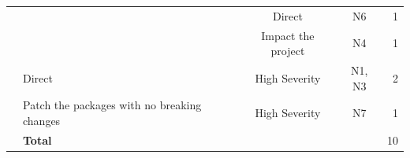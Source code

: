 \documentclass[conference]{IEEEtran}
\begin{document}
\begin{table}[tb]
\begin{tabular}{|c|l|c|c|r|}
			\multicolumn{1}{|c|}{}                                     & \multicolumn{1}{c|}{}                               & Direct                                             & N6                  & 1               \\ \cline{3-5} 
			\multicolumn{1}{|c|}{}                                     & \multicolumn{1}{c|}{}                               & Impact the project                                 & N4                  & 1               \\ \cline{2-5} 
			\multicolumn{1}{|c|}{}                                     & \multicolumn{1}{l|}{Direct}                         & High Severity                                      & N1, N3              & 2               \\ \cline{2-5} 
			\multicolumn{1}{|c|}{}                                     & Patch the packages with no breaking changes         & High Severity                                      & N7                  & 1               \\ \cline{2-5} 
			\multicolumn{1}{|l|}{}                                     & \multicolumn{3}{l|}{\textbf{Total}}                                                                                            & 10              \\ \hline
		\end{tabular}
		\label{table:npm-pri2}
	\end{table}
	
\end{document}
